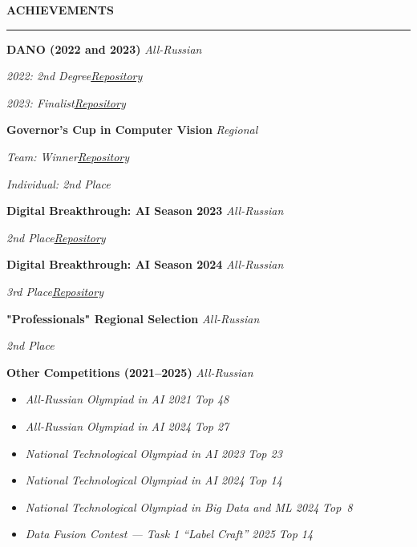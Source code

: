\documentclass[10pt,a4paper]{article}
\newcommand{\sechead}[1]{%
  \noindent\textbf{#1}\par
  \vspace{-8pt}
  \noindent\rule{\linewidth}{0.4pt}\par\vspace{0.1cm}
}
\begin{document}
\sechead{ACHIEVEMENTS}

\textbf{DANO (2022 and 2023)} \hfill \emph{All-Russian}

\textit{2022: 2nd Degree}\hfill \emph{\href{https://github.com/D1ffic00lt/dano-olympiad-final-stage}{Repository}}\vspace{0cm}

\textit{2023: Finalist}\hfill \emph{\href{https://github.com/D1ffic00lt/dano-2023}{Repository}}\vspace{0.1cm}

\textbf{Governor’s Cup in Computer Vision} \hfill \emph{Regional}

\textit{Team: Winner}\hfill \emph{\href{https://github.com/D1ffic00lt/computer-vision-cup}{Repository}}\vspace{0cm}

\textit{Individual: 2nd Place}\vspace{0.1cm}


\textbf{Digital Breakthrough: AI Season 2023} \hfill \emph{All-Russian}

\textit{2nd Place}\hfill \emph{\href{https://github.com/llitone/rutube-video-captioning}{Repository}}\vspace{0.1cm}


\textbf{Digital Breakthrough: AI Season 2024} \hfill \emph{All-Russian}

\textit{3rd Place}\hfill \emph{\href{https://github.com/D1ffic00lt/Sky-Eye}{Repository}}\vspace{0.1cm}

\textbf{"Professionals" Regional Selection} \hfill \emph{All-Russian}

\textit{2nd Place}\vspace{0.1cm}

\textbf{Other Competitions (2021–2025)} \hfill \emph{All-Russian}

\begin{itemize}[
    label=$\cdot$, 
    itemsep=0.1em,
    topsep=0pt,
    parsep=0pt
]
    \item \textit{All-Russian Olympiad in AI 2021} \hfill \emph{Top 48}
    \item \textit{All-Russian Olympiad in AI 2024} \hfill \emph{Top 27}
    \item \textit{National Technological Olympiad in AI 2023} \hfill \emph{Top 23}
    \item \textit{National Technological Olympiad in AI 2024} \hfill \emph{Top 14}
    \item \textit{National Technological Olympiad in Big Data and ML 2024} \hfill \mbox{\emph{Top 8}\hspace{1ex}} 
    \item \textit{Data Fusion Contest — Task 1 “Label Craft” 2025} \hfill \emph{Top 14}
\end{itemize}\vspace{0.3cm}
\end{document}
